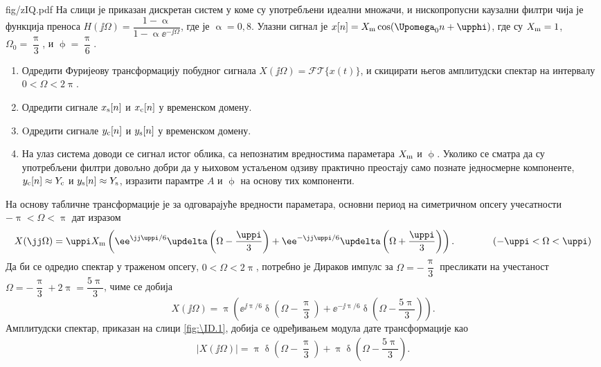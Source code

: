 \begin{slikaDesno}{fig/zIQ.pdf}
\PID На слици је приказан дискретан систем у коме 
су употребљени идеални множачи, и 
нископропусни каузални филтри 
\vspace*{1mm}
чија је функција преноса 
$H(\jj\Omega) = \dfrac{1 - \upalpha}{1 - 
\upalpha\ee^{-\jj\Omega}}$, где је $\upalpha = 0,8$.
Улазни сигнал је 
$x[n] = X_{\rm m} \cos(\Upomega_0 n + \upphi)$, где су 
$X_{\rm m} = 1$, 
$\Omega_0 = \dfrac{\uppi}{3}$, и $\upphi = \dfrac{\uppi}{6}$. 
\end{slikaDesno}
\begin{enumerate}[label=(\alph*)]
    \item Одредити Фуријеову 
    трансформацију побудног 
    сигнала $X(\jj\Omega) = \mathcal{FT}\{x(t)\}$,
    и скицирати његов амплитудски спектар на 
    интервалу $0 < \Omega < 2\uppi$.
    \item Одредити сигнале $x_{\rm s}[n]$ и 
    $x_{\rm c}[n]$ у временском домену. 
    \item Oдредити сигнале $y_{\rm c}[n]$ и
    $y_{\rm s}[n]$ у временском домену.
    \item  На улаз система доводи 
    се сигнал истог облика, са непознатим 
    вредностима параметара $X_{\rm m}$ и $\upphi$.  
    Уколико се сматра да су употребљени филтри 
    довољно добри да у њиховом устаљеном одзиву 
    практично преостају само познате 
    једносмерне компоненте,
    $y_{\rm c}[n] \approx Y_{\rm c}$ и
    $y_{\rm s}[n] \approx Y_{\rm s}$, 
    изразити парамтре $A$ и $\upphi$ на основу 
    тих компоненти.
\end{enumerate}

\RESENJE 
На основу табличне трансформације  је за одговарајуће вредности параметара, 
основни период на симетричном опсегу учесатности $-\uppi < \Omega < \uppi$ дат изразом
\begin{equation}
   X(\jj\Omega) = \uppi X_{\rm m} \left(
    \ee^{\jj\uppi/6} \updelta\left(\Omega - \dfrac{\uppi}{3}\right)
    +
    \ee^{-\jj\uppi/6} \updelta\left(\Omega + \dfrac{\uppi}{3}\right)
   \right). \qquad\qquad (-\uppi < \Omega < \uppi) \label{eq:\ID.xjw}
\end{equation}
Да би се одредио спектар у траженом опсегу, $0 < \Omega < 2\uppi$, потребно је 
Дираков импулс за $\Omega = -\dfrac{\uppi}{3}$ пресликати на учестаност 
$\Omega = -\dfrac{\uppi}{3} + 2\uppi = \dfrac{5\uppi}{3}$, чиме се добија 
\begin{equation}
    X(\jj\Omega) = \uppi\left(
        \ee^{\jj\uppi/6} \updelta\left(\Omega - \dfrac{\uppi}{3}\right)
        +
        \ee^{-\jj\uppi/6} \updelta\left(\Omega - \dfrac{5\uppi}{3}\right)
       \right).
\end{equation}
Амплитудски спектар, приказан на слици \ref{fig:\ID.1},
добија се одређивањем модула дате трансформације као 
\begin{eqnarray}
    |X(\jj\Omega)| = 
        \uppi 
        \updelta\left(\Omega - \dfrac{\uppi}{3}\right)
        +
        \uppi 
        \updelta\left(\Omega - \dfrac{5\uppi}{3}\right).
\end{eqnarray}

